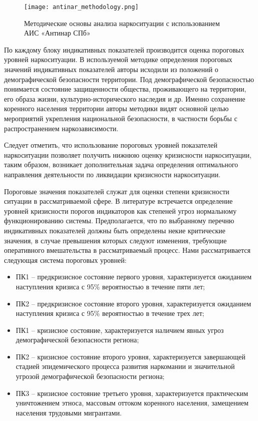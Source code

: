 \begin{figure}
    \texttt{[image: antinar\_methodology.png]}
    \caption{Методические основы анализа наркоситуации с использованием АИС
    «Антинар СПб»}
    \label{fig:antinar_methodology}
\end{figure}

По каждому блоку индикативных показателей производится оценка пороговых уровней
наркоситуации. В используемой методике определения пороговых значений
индикативных показателей авторы исходили из положений о демографической
безопасности территории. Под демографической безопасностью понимается состояние
защищенности общества, проживающего на территории, его образа жизни,
культурно-исторического наследия и др. Именно сохранение коренного населения
территории авторы методики видят основной целью мероприятий укрепления
национальной безопасности, в частности борьбы с распространением
наркозависимости.

Следует отметить, что использование пороговых уровней показателей наркоситуации
позволяет получить нижнюю оценку кризисности наркоситуации, таким образом,
возникает дополнительная задача определения оптимального направления
деятельности по ликвидации кризисности наркоситуации.

Пороговые значения показателей служат для оценки степени кризисности ситуации в
рассматриваемой сфере. В литературе встречается определение уровней
кризисности порогов индикаторов как степеней угроз нормальному функционированию
системы. Предполагается, что по выбранному перечню индикативных показателей
должны быть определены некие критические значения, в случае превышения которых
следуют изменения, требующие оперативного вмешательства в рассматриваемый
процесс. Нами рассматривается следующая система пороговых уровней:
\begin{itemize}
\item[] ПК1 – предкризисное состояние первого уровня, характеризуется ожиданием
наступления кризиса с 95\% вероятностью в течение пяти лет;
\item[] ПК2 – предкризисное состояние второго уровня, характеризуется ожиданием
наступления кризиса с 95\% вероятностью в течение трех лет;
\item[] ПК1 – кризисное состояние, характеризуется наличием явных угроз демографической
безопасности региона;
\item[] ПК2 – кризисное состояние второго уровня, характеризуется завершающей стадией
эпидемического процесса развития наркомании и значительной угрозой
демографической безопасности региона;
\item[] ПК3 – кризисное состояние третьего уровня, характеризуется практическим
уничтожением этноса, массовым оттоком коренного населения, замещением населения
трудовыми мигрантами.
\end{itemize}

